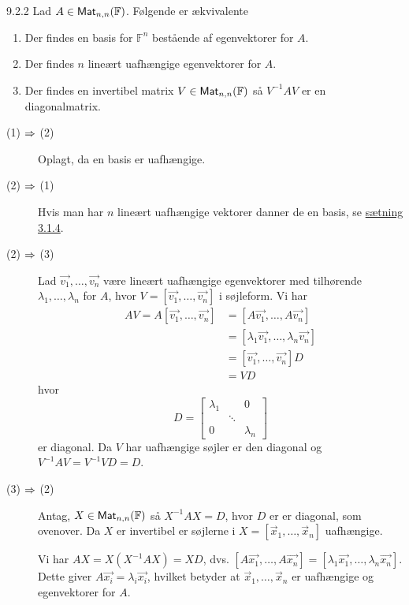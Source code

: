 %
%

\begin{lemma}{9.2.2}
	Lad $A \in \textsf{Mat}_{n,n}(\mathbb{F})$. Følgende er ækvivalente
	\begin{enumerate}[(1)]
		\item Der findes en basis for $\mathbb{F}^n$ bestående af egenvektorer
			for $A$.
		\item Der findes $n$ lineært uafhængige egenvektorer for $A$.
		\item Der findes en invertibel matrix $V \in \textsf{Mat}_{n,n}(\mathbb{F})$ så
			$V^{-1}AV$ er en diagonalmatrix.
	\end{enumerate}
\end{lemma}

\begin{bevis}
	\begin{description}
		\item[(1) $\Rightarrow$ (2)] Oplagt, da en basis er uafhængige.
		\item[(2) $\Rightarrow$ (1)] Hvis man har $n$ lineært uafhængige vektorer
			danner de en basis, se \hyperlink{3.1.4}{sætning 3.1.4}.
		\item[(2) $\Rightarrow$ (3)] Lad $\vec{v_1}, \dotsc, \vec{v_n}$ være lineært
			uafhængige egenvektorer med tilhørende $\lambda_1, \dotsc,
			\lambda_n$ for $A$, hvor $V = [\vec{v_1}, \dotsc, \vec{v_n}]$ i
			søjleform. Vi har
			\begin{align*}
				AV = A[\vec{v_1}, \dotsc, \vec{v_n}] &= [A\vec{v_1}, \dotsc,
						A\vec{v_n}] \\
					&= [\lambda_1\vec{v_1}, \dotsc, \lambda_n\vec{v_n}] \\
					&= [\vec{v_1}, \dotsc, \vec{v_n}] D \\
					&= VD
			\end{align*}
			hvor
			\[
				D = \begin{bmatrix}
					\lambda_1 & & 0 \\
					& \ddots & \\
					0 & & \lambda_n
				\end{bmatrix}
			\]
			er diagonal. Da $V$ har uafhængige søjler er den diagonal og 
			$V^{-1}AV = V^{-1}VD = D$.
		\item[(3) $\Rightarrow$ (2)] Antag, $X \in \textsf{Mat}_{n,n}(\mathbb{F})$ så
			$X^{-1}AX = D$, hvor $D$ er er diagonal, som ovenover. Da $X$ er 
			invertibel er søjlerne i $X = [\vec{x}_1, \dotsc, \vec{x}_n]$
			uafhængige.
			
			Vi har $AX = X(X^{-1}AX) = XD$, dvs. $[A\vec{x_1}, \dotsc,
			A\vec{x_n}] = [\lambda_1\vec{x_1}, \dotsc, \lambda_n\vec{x_n}]$.
			Dette giver $A\vec{x_i} = \lambda_i \vec{x_i}$, hvilket betyder
			at $\vec{x}_1, \dotsc, \vec{x}_n$ er uafhængige og egenvektorer for
			$A$.
	\end{description}
\end{bevis}
